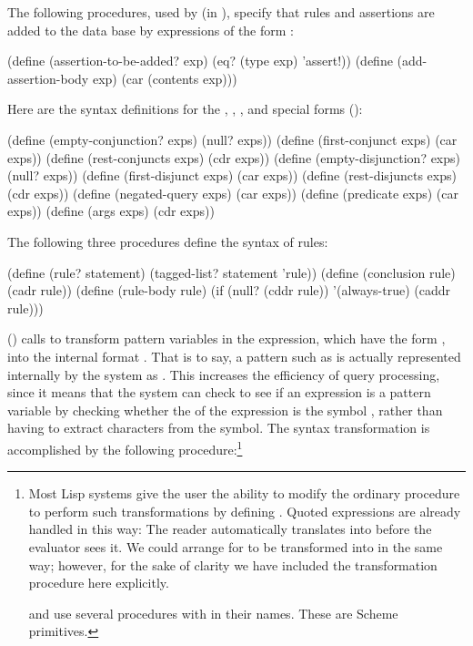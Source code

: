 \noindent
The following procedures, used by  (in
), specify that rules and assertions are added to the data base by
expressions of the form :

\begin{codeBlock}
(define (assertion-to-be-added? exp)
  (eq? (type exp) 'assert!))
(define (add-assertion-body exp) (car (contents exp)))
\end{codeBlock}

\noindent
Here are the syntax definitions for the , , , and
 special forms ():

\begin{codeBlock}
(define (empty-conjunction? exps) (null? exps))
(define (first-conjunct exps) (car exps))
(define (rest-conjuncts exps) (cdr exps))
(define (empty-disjunction? exps) (null? exps))
(define (first-disjunct exps) (car exps))
(define (rest-disjuncts exps) (cdr exps))
(define (negated-query exps) (car exps))
(define (predicate exps) (car exps))
(define (args exps) (cdr exps))
\end{codeBlock}

\noindent
The following three procedures define the syntax of rules:

\begin{codeBlock}
(define (rule? statement)
  (tagged-list? statement 'rule))
(define (conclusion rule) (cadr rule))
(define (rule-body rule)
  (if (null? (cddr rule)) '(always-true) (caddr rule)))
\end{codeBlock}

\noindent
{} () calls
 to transform pattern variables in the expression,
which have the form , into the internal format .
That is to say, a pattern such as  is actually represented
internally by the system as .  This increases the
efficiency of query processing, since it means that the system can check to see
if an expression is a pattern variable by checking whether the  of
the expression is the symbol , rather than having to extract characters
from the symbol.  The syntax transformation is accomplished by the following
procedure:\footnote{Most Lisp systems give the user the ability to modify the
ordinary  procedure to perform such transformations by defining
.  Quoted expressions are already handled in
this way: The reader automatically translates  into
 before the evaluator sees it.  We could arrange for
 to be transformed into  in the same
way; however, for the sake of clarity we have included the transformation
procedure here explicitly.

 and  use several
procedures with  in their names.  These are Scheme primitives.}

